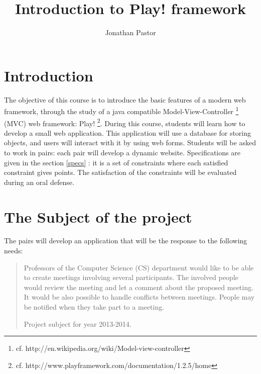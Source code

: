 \documentclass{article}         %
\title{Introduction to Play! framework}     %
\author{Jonathan Pastor}        %
\begin{document}

\maketitle                        %


\section{Introduction}

The objective of this course is to introduce the basic features of a modern web framework, through the study of a java compatible Model-View-Controller \footnote{cf. http://en.wikipedia.org/wiki/Model-view-controller} (MVC) web framework: Play! \footnote{cf. http://www.playframework.com/documentation/1.2.5/home}.
\newline
\newline
During this course, students will learn how to develop a small web application. This application will use a database for storing objects, and users will interact with it by using web forms.
\newline
\newline
Students will be asked to work in pairs: each pair will develop a dynamic website. Specifications are given in the section \ref{specs} : it is a set of constraints where each satisfied constraint gives points. The satisfaction of the constraints will be evaluated during an oral defense.



\section{The Subject of the project}

The pairs will develop an application that will be the response to the following needs:

\begin{quotation}
Professors of the Computer Science (CS) department would like to be able to create meetings involving several participants. The involved people would review the meeting and let a comment about the proposed meeting. It would be also possible to handle conflicts between meetings. People may be notified when they take part to a meeting.\par
\raggedleft Project subject for year 2013-2014.
\end{quotation}
\end{document}
